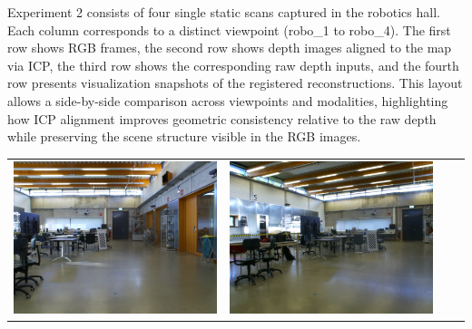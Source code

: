 \documentclass[english, bachelor, utf8]{base/thesis_telematics}
\begin{document}
Experiment 2 consists of four single static scans captured in the robotics hall. Each column corresponds to a
distinct viewpoint (robo\_1 to robo\_4). The first row shows RGB frames, the second row shows depth images
aligned to the map via ICP, the third row shows the corresponding raw depth inputs, and the fourth row presents
visualization snapshots of the registered reconstructions. This layout allows a side-by-side comparison across
viewpoints and modalities, highlighting how ICP alignment improves geometric consistency relative to the raw
depth while preserving the scene structure visible in the RGB images.

\begin{table}[h]
\centering
\begin{tabular}{
  >{\centering\arraybackslash}m{}
  >{\centering\arraybackslash}m{}
  >{\centering\arraybackslash}m{}
  >{\centering\arraybackslash}m{}
}
    \includegraphics[width=\linewidth]{pics/robo/robo_1/image.png} &
    \includegraphics[width=\linewidth]{pics/robo/robo_2/image.png} &

\end{tabular}
\end{table}
\end{document}
